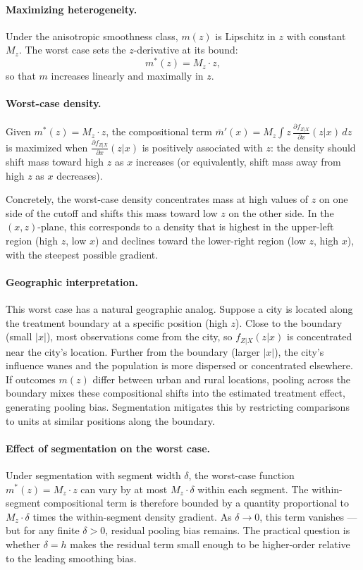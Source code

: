 \paragraph{Maximizing heterogeneity.}
Under the anisotropic smoothness class, $m(z)$ is Lipschitz in $z$ with constant $M_z$.
The worst case sets the $z$-derivative at its bound:
\begin{equation}\label{eq:worst_case_m}
	m^*(z) = M_z \cdot z,
\end{equation}
so that $m$ increases linearly and maximally in $z$.

\paragraph{Worst-case density.}
Given $m^*(z) = M_z \cdot z$, the compositional term $\bar{m}'(x) = M_z \int z\, \frac{\partial f_{Z|X}}{\partial x}(z|x)\, dz$ is maximized when $\frac{\partial f_{Z|X}}{\partial x}(z|x)$ is positively associated with $z$: the density should shift mass toward high $z$ as $x$ increases (or equivalently, shift mass away from high $z$ as $x$ decreases).

Concretely, the worst-case density concentrates mass at high values of $z$ on one side of the cutoff and shifts this mass toward low $z$ on the other side.
In the $(x,z)$-plane, this corresponds to a density that is highest in the upper-left region (high $z$, low $x$) and declines toward the lower-right region (low $z$, high $x$), with the steepest possible gradient.

\paragraph{Geographic interpretation.}
This worst case has a natural geographic analog.
Suppose a city is located along the treatment boundary at a specific position (high $z$).
Close to the boundary (small $|x|$), most observations come from the city, so $f_{Z|X}(z|x)$ is concentrated near the city's location.
Further from the boundary (larger $|x|$), the city's influence wanes and the population is more dispersed or concentrated elsewhere.
If outcomes $m(z)$ differ between urban and rural locations, pooling across the boundary mixes these compositional shifts into the estimated treatment effect, generating pooling bias.
Segmentation mitigates this by restricting comparisons to units at similar positions along the boundary.

\paragraph{Effect of segmentation on the worst case.}
Under segmentation with segment width $\delta$, the worst-case function $m^*(z) = M_z \cdot z$ can vary by at most $M_z \cdot \delta$ within each segment.
The within-segment compositional term is therefore bounded by a quantity proportional to $M_z \cdot \delta$ times the within-segment density gradient.
As $\delta \to 0$, this term vanishes --- but for any finite $\delta > 0$, residual pooling bias remains.
The practical question is whether $\delta = h$ makes the residual term small enough to be higher-order relative to the leading smoothing bias.
